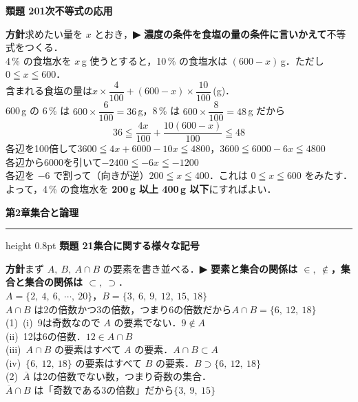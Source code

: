\documentclass[a4paper,11pt]{ltjsarticle}
\newcommand{\ans}[2]{\Needspace{5\baselineskip}\vspace{6pt}%
  {\sffamily\bfseries 類題 #1\quad #2}\par}
\newcommand{\point}[1]{\textsf{\bfseries ▶ #1}}
\newcommand{\shouans}[2]{\Needspace{8\baselineskip}\vspace{10pt}\markboth{解答\quad #1\quad #2}{}%
  {\sffamily\bfseries\Large #1\quad #2\par}\vspace{2pt}\hrule height 0.8pt\vspace{2pt}}
\begin{document}
\ans{20}{1次不等式の応用}
\begin{kai}
\textbf{方針}\quad 求めたい量を $x$ とおき，\point{濃度の条件を食塩の量の条件に言いかえて}不等式をつくる．\\[2pt]
4\,\% の食塩水を $x$\,g 使うとすると，10\,\% の食塩水は $(600-x)$\,g．\quad ただし $0\leqq x\leqq600$．\\
含まれる食塩の量は\quad $x\times\dfrac{4}{100}+(600-x)\times\dfrac{10}{100}$\,(g)．\\[2pt]
600\,g の 6\,\% は $600\times\dfrac{6}{100}=36$\,g，8\,\% は $600\times\dfrac{8}{100}=48$\,g だから
\[36\leqq\frac{4x}{100}+\frac{10(600-x)}{100}\leqq48\]
各辺を100倍して\quad $3600\leqq4x+6000-10x\leqq4800$，\quad $3600\leqq6000-6x\leqq4800$\\
各辺から6000を引いて\quad $-2400\leqq-6x\leqq-1200$\\
各辺を $-6$ で割って（向きが逆）\quad $200\leqq x\leqq400$．これは $0\leqq x\leqq600$ をみたす．\\[2pt]
よって，4\,\% の食塩水を \textbf{200\,g 以上 400\,g 以下}にすればよい．
\end{kai}


\shouans{第2章}{集合と論理}
\ans{21}{集合に関する様々な記号}
\begin{kai}
\textbf{方針}\quad まず $A,\ B,\ A\cap B$ の要素を書き並べる．\point{要素と集合の関係は $\in,\ \notin$，集合と集合の関係は $\subset,\ \supset$}．\\[2pt]
$A=\{2,\ 4,\ 6,\ \cdots,\ 20\}$，\quad $B=\{3,\ 6,\ 9,\ 12,\ 15,\ 18\}$\\
$A\cap B$ は2の倍数かつ3の倍数，つまり6の倍数だから\quad $A\cap B=\{6,\ 12,\ 18\}$\\[2pt]
(1)\ (i)\ 9は奇数なので $A$ の要素でない．\quad $9\notin A$\\
\hspace*{1.5em}(ii)\ 12は6の倍数．\quad $12\in A\cap B$\\
\hspace*{1.5em}(iii)\ $A\cap B$ の要素はすべて $A$ の要素．\quad $A\cap B\subset A$\\
\hspace*{1.5em}(iv)\ $\{6,\ 12,\ 18\}$ の要素はすべて $B$ の要素．\quad $B\supset\{6,\ 12,\ 18\}$\\[2pt]
(2)\ $\overline A$ は2の倍数でない数，つまり奇数の集合．\\
\hspace*{1.5em}$\overline A\cap B$ は「奇数である3の倍数」だから\quad $\{3,\ 9,\ 15\}$
\end{kai}
\end{document}
